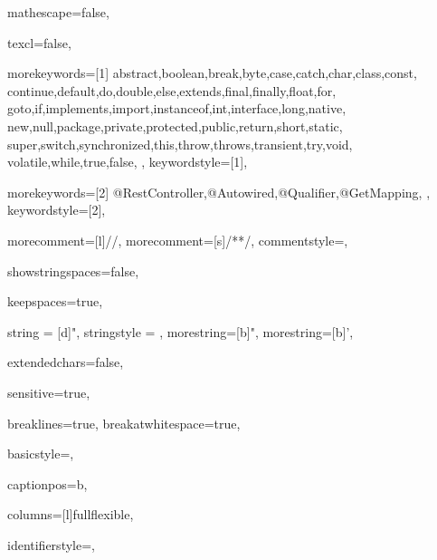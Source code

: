  {

mathescape=false,

texcl=false,

morekeywords=[1]{
abstract,boolean,break,byte,case,catch,char,class,const,
continue,default,do,double,else,extends,final,finally,float,for,
goto,if,implements,import,instanceof,int,interface,long,native,
new,null,package,private,protected,public,return,short,static,
super,switch,synchronized,this,throw,throws,transient,try,void,
volatile,while,true,false,
},
keywordstyle=[1]{\ttfamily\color{RoyalBlue}},

morekeywords=[2]{
@RestController,@Autowired,@Qualifier,@GetMapping,
},
keywordstyle=[2]{\ttfamily\color{VioletRed}},

morecomment=[l]//,
morecomment=[s]{/*}{*/},
commentstyle={\ttfamily\color{SeaGreen}},

showstringspaces=false,

keepspaces=true,

string = [d]{"},
stringstyle = {\ttfamily\color{FireBrick}},
morestring=[b]",
morestring=[b]',


extendedchars=false,

sensitive=true,

breaklines=true,
breakatwhitespace=true,

basicstyle=\ttfamily\small,

captionpos=b,

columns=[l]fullflexible,

identifierstyle={\ttfamily\color{DarkGray}},

}
